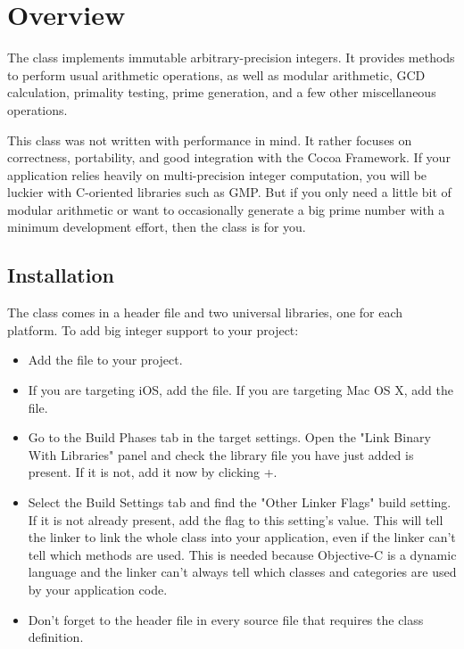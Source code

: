 \section{Overview}

The  class implements immutable arbitrary-precision integers. It provides methods to perform usual arithmetic operations, as well as modular arithmetic, GCD calculation, primality testing, prime generation, and a few other miscellaneous operations.

This class was not written with performance in mind. It rather focuses on correctness, portability, and good integration with the Cocoa Framework. If your application relies heavily on multi-precision integer computation, you will be luckier with C-oriented libraries such as GMP. But if you only need a little bit of modular arithmetic or want to occasionally generate a big prime number with a minimum development effort, then the  class is for you.

\subsection{Installation}

The  class comes in a header file and two universal libraries, one for each platform. To add big integer support to your project:

\begin{itemize}

\item Add the  file to your project.

\item If you are targeting iOS, add the  file. If you are targeting Mac OS X, add the  file.

\item Go to the Build Phases tab in the target settings. Open the "Link Binary With Libraries" panel and check the library file you have just added is present. If it is not, add it now by clicking +.

\item Select the Build Settings tab and find the "Other Linker Flags" build setting. If it is not already present, add the flag  to this setting's value. This will tell the linker to link the whole  class into your application, even if the linker can’t tell which methods are used. This is needed because Objective-C is a dynamic language and the linker can’t always tell which classes and categories are used by your application code. 

\item Don't forget to  the header file in every source file that requires the  class definition.

\end{itemize}

